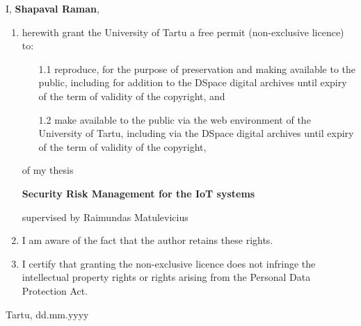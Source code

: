 \documentclass[12pt]{article}
\begin{document}
I, \textbf{Shapaval Raman},

\begin{enumerate}
\item
herewith grant the University of Tartu a free permit (non-exclusive licence) to:
\begin{enumerate}
\item[1.1]
reproduce, for the purpose of preservation and making available to the public, including for addition to the DSpace digital archives until expiry of the term of validity of the copyright, and
\item[1.2]
make available to the public via the web environment of the University of Tartu, including via the DSpace digital archives until expiry of the term of validity of the copyright,
\end{enumerate}

of my thesis

\textbf{Security Risk Management for the IoT systems}

supervised by Raimundas Matulevicius

\item
I am aware of the fact that the author retains these rights.
\item
I certify that granting the non-exclusive licence does not infringe the intellectual property rights or rights arising from the Personal Data Protection Act. 
\end{enumerate}

\noindent
Tartu, dd.mm.yyyy
\end{document}
